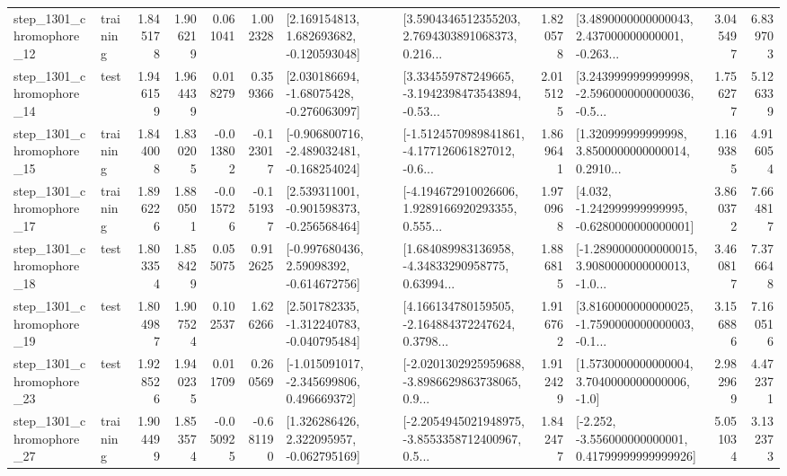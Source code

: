 \begin{tabular}{llrrrrllrlrr}
 step\_1301\_chromophore\_12 &  training &      1.845178 &    1.906219 &      0.061041 &  1.002328 &    [2.169154813, 1.682693682, -0.120593048] &  [3.5904346512355203, 2.7694303891068373, 0.216... &       1.820578 &  [3.4890000000000043, 2.437000000000001, -0.263... &            3.045497 &          6.839703 \\
 step\_1301\_chromophore\_14 &      test &      1.946159 &    1.964439 &      0.018279 &  0.359366 &    [2.030186694, -1.68075428, -0.276063097] &  [3.334559787249665, -3.1942398473543894, -0.53... &       2.015125 &  [3.2439999999999998, -2.5960000000000036, -0.5... &            1.756277 &          5.126339 \\
 step\_1301\_chromophore\_15 &  training &      1.844008 &    1.830205 &     -0.013802 & -0.123017 &  [-0.906800716, -2.489032481, -0.168254024] &  [-1.5124570989841861, -4.177126061827012, -0.6... &       1.869641 &  [1.320999999999998, 3.8500000000000014, 0.2910... &            1.169385 &          4.916054 \\
 step\_1301\_chromophore\_17 &  training &      1.896226 &    1.880501 &     -0.015726 & -0.151937 &   [2.539311001, -0.901598373, -0.256568464] &  [-4.194672910026606, 1.9289166920293355, 0.555... &       1.970968 &   [4.032, -1.242999999999995, -0.6280000000000001] &            3.860372 &          7.664817 \\
 step\_1301\_chromophore\_18 &      test &      1.803354 &    1.858429 &      0.055075 &  0.912625 &    [-0.997680436, 2.59098392, -0.614672756] &  [1.684089983136958, -4.34833290958775, 0.63994... &       1.886815 &  [-1.2890000000000015, 3.9080000000000013, -1.0... &            3.460817 &          7.376648 \\
 step\_1301\_chromophore\_19 &      test &      1.804987 &    1.907524 &      0.102537 &  1.626266 &   [2.501782335, -1.312240783, -0.040795484] &  [4.166134780159505, -2.164884372247624, 0.3798... &       1.916762 &  [3.8160000000000025, -1.7590000000000003, -0.1... &            3.156886 &          7.160516 \\
 step\_1301\_chromophore\_23 &      test &      1.928526 &    1.940235 &      0.011709 &  0.260569 &   [-1.015091017, -2.345699806, 0.496669372] &  [-2.0201302925959688, -3.8986629863738065, 0.9... &       1.912429 &     [1.5730000000000004, 3.7040000000000006, -1.0] &            2.982969 &          4.472371 \\
 step\_1301\_chromophore\_27 &  training &      1.904499 &    1.853574 &     -0.050925 & -0.681190 &    [1.326286426, 2.322095957, -0.062795169] &  [-2.2054945021948975, -3.8553358712400967, 0.5... &       1.842477 &  [-2.252, -3.556000000000001, 0.41799999999999926] &            5.051034 &          3.132373 \\

\end{tabular}
